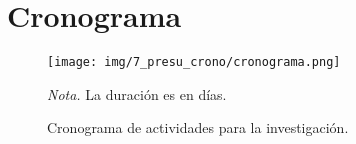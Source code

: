 \section{Cronograma}
\begin{figure}[H]
    \centering
    \caption{Cronograma de actividades para la investigación.}
    \texttt{[image: img/7\_presu\_crono/cronograma.png]}
    \label{fig:cronograma}
    \begin{flushleft}
        \vspace{-\baselineskip}
        \textit{Nota.} La duración es en días.        
        \vspace{-\baselineskip}
    \end{flushleft}
\end{figure}